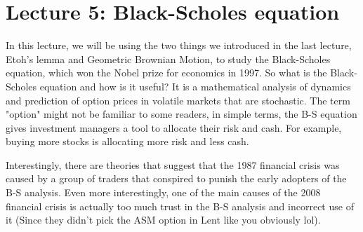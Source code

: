 \documentclass{report}
\begin{document}
\chapter{Lecture 5: Black-Scholes equation}
In this lecture, we will be using the two things we introduced in the last lecture, Etoh's lemma and Geometric Brownian Motion, to study the Black-Scholes equation, which won the Nobel prize for economics in 1997. So what is the Black-Scholes equation and how is it useful? It is a mathematical analysis of dynamics and prediction of option prices in volatile markets that are stochastic. The term "option" might not be familiar to some readers, in simple terms, the B-S equation gives investment managers a tool to allocate their risk and cash. For example, buying more stocks is allocating more risk and less cash.

Interestingly, there are theories that suggest that the 1987 financial crisis was caused by a group of traders that conspired to punish the early adopters of the B-S analysis. Even more interestingly, one of the main causes of the 2008 financial crisis is actually too much trust in the B-S analysis and incorrect use of it (Since they didn't pick the ASM option in Lent like you obviously lol).
\end{document}
